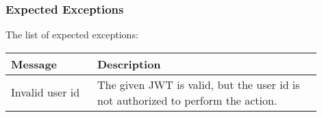 \documentclass[11pt, a4paper]{article}
\begin{document}
\subsubsection{Expected Exceptions}
The list of expected exceptions: \\

\begin{tabular}{|>{\centering\arraybackslash}m{0.25\linewidth}|>{\arraybackslash}m{0.65\linewidth}|} \hline
    Message &  Description\\ \hline
    Invalid user id &  The given JWT is valid, but the user id is not authorized to perform the action. \\ \hline   
    
\end{tabular}
\end{document}
